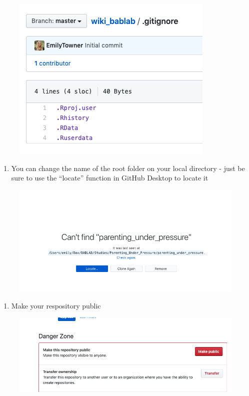 \documentclass[]{book}
\providecommand{\tightlist}{%
  \setlength{\itemsep}{0pt}\setlength{\parskip}{0pt}}
\begin{document}
\begin{figure}
\centering
\includegraphics{images/research_protocols/github/18.png}
\caption{}
\end{figure}

\begin{enumerate}
\def\labelenumi{\arabic{enumi}.}
\setcounter{enumi}{11}
\tightlist
\item
  You can change the name of the root folder on your local directory - just be sure to use the ``locate'' function in GitHub Desktop to locate it
\end{enumerate}

\begin{figure}
\centering
\includegraphics{images/research_protocols/github/20.png}
\caption{}
\end{figure}

\begin{enumerate}
\def\labelenumi{\arabic{enumi}.}
\setcounter{enumi}{12}
\tightlist
\item
  Make your respository public
\end{enumerate}

\begin{figure}
\centering
\includegraphics{images/research_protocols/github/19.png}
\caption{}
\end{figure}
\end{document}
